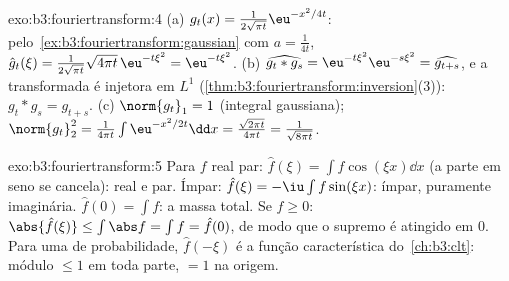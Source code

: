 \begin{solution}{exo:b3:fouriertransform:4}
(a) $g_t(x) = \frac1{2\sqrt{\pi t}}\eu^{-x^2/4t}$: pelo~\cref{ex:b3:fouriertransform:gaussian} com $a = \frac1{4t}$,
$\hat g_t(\xi) = \frac1{2\sqrt{\pi t}}\sqrt{4\pi
t}\,\eu^{-t\xi^2} = \eu^{-t\xi^2}$.
(b) $\widehat{g_t * g_s} = \eu^{-t\xi^2}\eu^{-s\xi^2} =
\widehat{g_{t+s}}$, e a transformada é injetora em $L^1$
(\cref{thm:b3:fouriertransform:inversion}(3)): $g_t * g_s =
g_{t+s}$.
(c) $\norm{g_t}_1 = 1$ (integral gaussiana);
$\norm{g_t}_2^2 = \frac1{4\pi t}\int\eu^{-x^2/2t}\dd x =
\frac{\sqrt{2\pi t}}{4\pi t} = \frac1{\sqrt{8\pi t}}$.
\end{solution}

\begin{solution}{exo:b3:fouriertransform:5}
Para $f$ real par: $\hat f(\xi) = \int f\cos(\xi x)\dd x$ (a
parte em seno se cancela): real e par. Ímpar: $\hat f(\xi) =
-\iu\int f\sin(\xi x)$: ímpar, puramente imaginária. $\hat f(0) =
\int f$: a massa total. Se $f \geq 0$: $\abs{\hat f(\xi)}
\leq \int\abs f = \int f = \hat f(0)$, de modo que o supremo é atingido
em $0$. Para uma  de probabilidade, $\hat f(-\xi)$ é a
função característica do~\cref{ch:b3:clt}: módulo $\leq 1$
em toda parte, $= 1$ na origem.
\end{solution}

